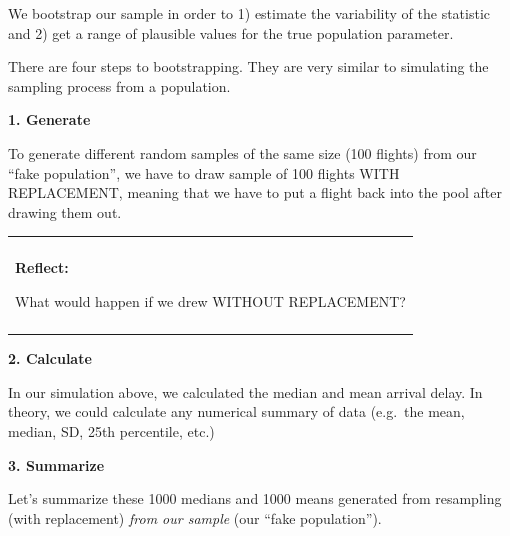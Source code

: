 \documentclass[
]{book}
\newenvironment{Shaded}{\begin{snugshade}}{\end{snugshade}}
\newcommand{\CommentTok}[1]{\textcolor[rgb]{0.56,0.35,0.01}{\textit{#1}}}
\newcommand{\DataTypeTok}[1]{\textcolor[rgb]{0.13,0.29,0.53}{#1}}
\newcommand{\DecValTok}[1]{\textcolor[rgb]{0.00,0.00,0.81}{#1}}
\newcommand{\KeywordTok}[1]{\textcolor[rgb]{0.13,0.29,0.53}{\textbf{#1}}}
\newcommand{\NormalTok}[1]{#1}
\newcommand{\OperatorTok}[1]{\textcolor[rgb]{0.81,0.36,0.00}{\textbf{#1}}}
\newcommand{\OtherTok}[1]{\textcolor[rgb]{0.56,0.35,0.01}{#1}}
\newcommand{\StringTok}[1]{\textcolor[rgb]{0.31,0.60,0.02}{#1}}
\newenvironment{reflect}
{
    \begin{center}
    
    \begin{tabular}{|p{0.8\textwidth}|}
    \rowcolor{LightBlue}
    \hline\\
    \rowcolor{LightBlue}
    \textbf{Reflect:}
}
{
    \\\rowcolor{LightBlue}
    \\\hline
    \end{tabular} 
    \end{center}
}
\begin{document}
We bootstrap our sample in order to 1) estimate the variability of the statistic and 2) get a range of plausible values for the true population parameter.

There are four steps to bootstrapping. They are very similar to simulating the sampling process from a population.

\textbf{1. Generate}

To generate different random samples of the same size (100 flights) from our ``fake population'', we have to draw sample of 100 flights WITH REPLACEMENT, meaning that we have to put a flight back into the pool after drawing them out.

\begin{reflect}
What would happen if we drew WITHOUT REPLACEMENT?
\end{reflect}

\textbf{2. Calculate}

In our simulation above, we calculated the median and mean arrival delay. In theory, we could calculate any numerical summary of data (e.g.~the mean, median, SD, 25th percentile, etc.)

\begin{Shaded}
\end{Shaded}

\textbf{3. Summarize}

Let's summarize these 1000 medians and 1000 means generated from resampling (with replacement) \emph{from our sample} (our ``fake population'').

\begin{Shaded}
\end{Shaded}
\end{document}
